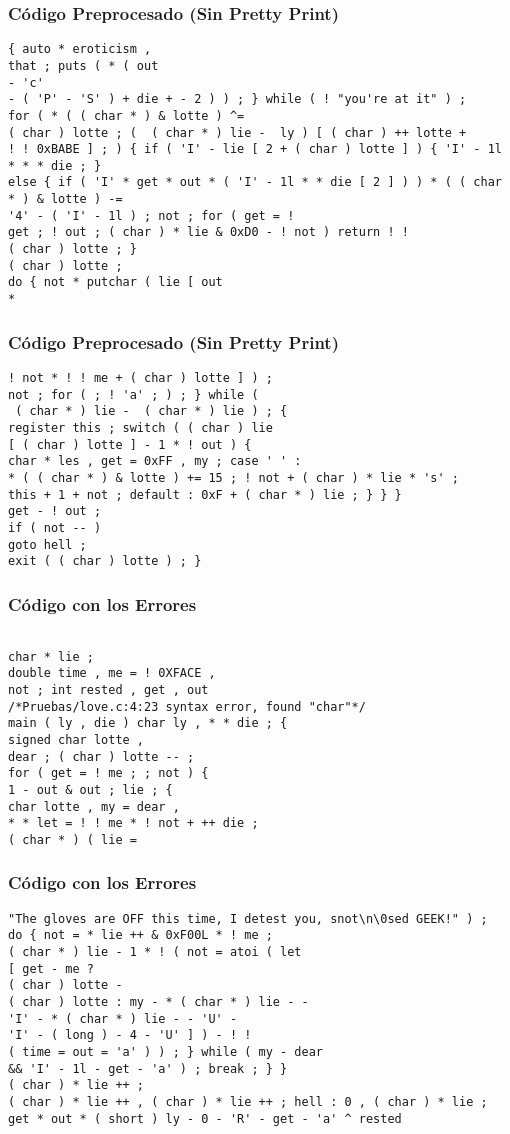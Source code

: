 \documentclass{beamer}
\begin{document}
\begin{frame}[fragile]
\frametitle{C\'odigo Preprocesado (Sin Pretty Print)}
\begin{lstlisting}[style=CStyle]
{ auto * eroticism , 
that ; puts ( * ( out 
- 'c' 
- ( 'P' - 'S' ) + die + - 2 ) ) ; } while ( ! "you're at it" ) ; 
for ( * ( ( char * ) & lotte ) ^= 
( char ) lotte ; (  ( char * ) lie -  ly ) [ ( char ) ++ lotte + 
! ! 0xBABE ] ; ) { if ( 'I' - lie [ 2 + ( char ) lotte ] ) { 'I' - 1l * * * die ; } 
else { if ( 'I' * get * out * ( 'I' - 1l * * die [ 2 ] ) ) * ( ( char * ) & lotte ) -= 
'4' - ( 'I' - 1l ) ; not ; for ( get = ! 
get ; ! out ; ( char ) * lie & 0xD0 - ! not ) return ! ! 
( char ) lotte ; } 
( char ) lotte ; 
do { not * putchar ( lie [ out 
* \end{lstlisting}
\end{frame}
\begin{frame}[fragile]
\frametitle{C\'odigo Preprocesado (Sin Pretty Print)}
\begin{lstlisting}[style=CStyle]
! not * ! ! me + ( char ) lotte ] ) ; 
not ; for ( ; ! 'a' ; ) ; } while ( 
 ( char * ) lie -  ( char * ) lie ) ; { 
register this ; switch ( ( char ) lie 
[ ( char ) lotte ] - 1 * ! out ) { 
char * les , get = 0xFF , my ; case ' ' : 
* ( ( char * ) & lotte ) += 15 ; ! not + ( char ) * lie * 's' ; 
this + 1 + not ; default : 0xF + ( char * ) lie ; } } } 
get - ! out ; 
if ( not -- ) 
goto hell ; 
exit ( ( char ) lotte ) ; } \end{lstlisting}
\end{frame}
\begin{frame}[fragile]
\frametitle{C\'odigo con los Errores}
\begin{lstlisting}[style=CStyle]

char * lie ; 
double time , me = ! 0XFACE , 
not ; int rested , get , out 
/*Pruebas/love.c:4:23 syntax error, found "char"*/
main ( ly , die ) char ly , * * die ; { 
signed char lotte , 
dear ; ( char ) lotte -- ; 
for ( get = ! me ; ; not ) { 
1 - out & out ; lie ; { 
char lotte , my = dear , 
* * let = ! ! me * ! not + ++ die ; 
( char * ) ( lie = 
\end{lstlisting}
\end{frame}
\begin{frame}[fragile]
\frametitle{C\'odigo con los Errores}
\begin{lstlisting}[style=CStyle]
"The gloves are OFF this time, I detest you, snot\n\0sed GEEK!" ) ; 
do { not = * lie ++ & 0xF00L * ! me ; 
( char * ) lie - 1 * ! ( not = atoi ( let 
[ get - me ? 
( char ) lotte - 
( char ) lotte : my - * ( char * ) lie - - 
'I' - * ( char * ) lie - - 'U' - 
'I' - ( long ) - 4 - 'U' ] ) - ! ! 
( time = out = 'a' ) ) ; } while ( my - dear 
&& 'I' - 1l - get - 'a' ) ; break ; } } 
( char ) * lie ++ ; 
( char ) * lie ++ , ( char ) * lie ++ ; hell : 0 , ( char ) * lie ; 
get * out * ( short ) ly - 0 - 'R' - get - 'a' ^ rested 
\end{lstlisting}
\end{frame}
\end{document}

